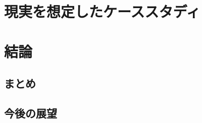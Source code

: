 \hypertarget{ux73feux5b9fux3092ux60f3ux5b9aux3057ux305fux30b1ux30fcux30b9ux30b9ux30bfux30c7ux30a3}{%
\chapter{現実を想定したケーススタディ}\label{ux73feux5b9fux3092ux60f3ux5b9aux3057ux305fux30b1ux30fcux30b9ux30b9ux30bfux30c7ux30a3}}

\hypertarget{ux7d50ux8ad6}{%
\chapter{結論}\label{ux7d50ux8ad6}}

\hypertarget{ux307eux3068ux3081}{%
\section{まとめ}\label{ux307eux3068ux3081}}

\hypertarget{ux4ecaux5f8cux306eux5c55ux671b}{%
\section{今後の展望}\label{ux4ecaux5f8cux306eux5c55ux671b}}
